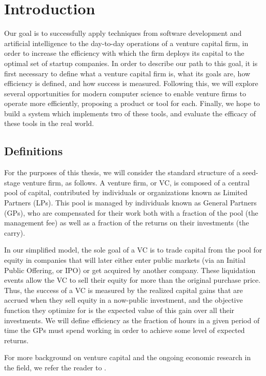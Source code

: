 \section{Introduction}

Our goal is to successfully apply techniques from software development and artificial intelligence to the day-to-day operations of a venture capital firm, in order to increase the efficiency with which the firm deploys its capital to the optimal set of startup companies. In order to describe our path to this goal, it is first necessary to define what a venture capital firm is, what its goals are, how efficiency is defined, and how success is measured. Following this, we will explore several opportunities for modern computer science to enable venture firms to operate more efficiently, proposing a product or tool for each. Finally, we hope to build a system which implements two of these tools, and evaluate the efficacy of these tools in the real world.

\subsection{Definitions}

For the purposes of this thesis, we will consider the standard structure of a seed-stage venture firm, as follows. A venture firm, or VC, is composed of a central pool of capital, contributed by individuals or organizations known as Limited Partners (LPs). This pool is managed by individuals known as General Partners (GPs), who are compensated for their work both with a fraction of the pool (the management fee) as well as a fraction of the returns on their investments (the carry).

In our simplified model, the sole goal of a VC is to trade capital from the pool for equity in companies that will later either enter public markets (via an Initial Public Offering, or IPO) or get acquired by another company. These liquidation events allow the VC to sell their equity for more than the original purchase price. Thus, the success of a VC is measured by the realized capital gains that are accrued when they sell equity in a now-public investment, and the objective function they optimize for is the expected value of this gain over all their investments. We will define efficiency as the fraction of hours in a given period of time the GPs must spend working in order to achieve some level of expected returns.

For more background on venture capital and the ongoing economic research in the field, we refer the reader to \cite{venture-survey}.


